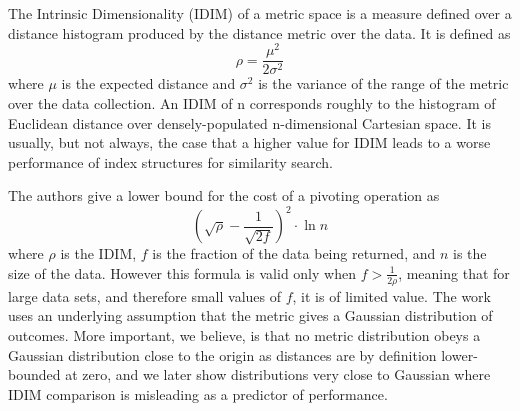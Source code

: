 

The Intrinsic Dimensionality (IDIM) of a metric space is a measure defined over a distance histogram produced by the distance metric over the data. It is defined as
\[ 
\rho = \frac{\mu^2}{2\sigma^2}
\]
where $\mu$ is the expected distance and $\sigma^2$ is the variance of the range of the metric over the data collection. An IDIM of n corresponds roughly to the histogram of Euclidean distance over densely-populated n-dimensional Cartesian space. It is usually, but not always, the case that a higher value for IDIM leads to a worse performance of index structures for similarity search.

The authors give a lower bound for the cost of a pivoting operation as
\[ \left( \sqrt{\rho} - \frac{1}{\sqrt{2f}} \right)^2 \cdot \ln n\]
where $\rho$ is the IDIM, $f$ is the fraction of the data being returned, and $n$ is the size of the data. However this formula is valid only when $f > \frac{1}{2\rho}$, meaning that for large data sets, and therefore small values of $f$, it is of limited value.
The work uses an underlying assumption that the metric gives a Gaussian distribution of outcomes. 
More important, we believe, is that no metric distribution obeys a Gaussian distribution close to the origin as distances are by definition lower-bounded at zero, and we later show distributions very close to Gaussian where IDIM comparison is misleading as a predictor of performance.

